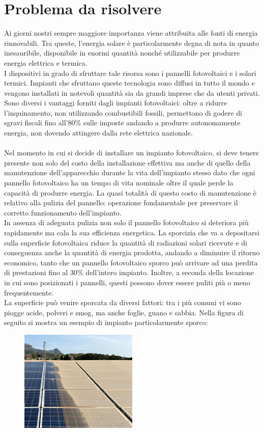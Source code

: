 \documentclass[a4paper, 12pt]{article}
\begin{document}
	\section{Problema da risolvere}
	Ai giorni nostri sempre maggiore importanza viene attribuita alle fonti di energia rinnovabili. Tra queste, l'energia solare è particolarmente degna di nota in quanto inesauribile, disponibile in enormi quantità nonché utilizzabile per produrre energia elettrica e termica.\\
	I dispositivi in grado di sfruttare tale risorsa sono i pannelli fotovoltaici e i solari termici. Impianti che sfruttano queste tecnologia sono diffusi in tutto il mondo e vengono installati in notevoli quantità sia da grandi imprese che da utenti privati. Sono diversi i vantaggi forniti dagli impianti fotovoltaici: oltre a ridurre l'inquinamento, non utilizzando combustibili fossili, permettono di godere di sgravi fiscali fino all'80\% sulle imposte andando a produrre autonomamente energia, non dovendo attingere dalla rete elettrica nazionale.\\\\
	Nel momento in cui si decide di installare un impianto fotovoltaico, si deve tenere presente non solo del costo della installazione effettiva ma anche di quello della manutenzione dell'apparecchio durante la vita dell'impianto stesso dato che ogni pannello fotovoltaico ha un tempo di vita nominale oltre il quale perde la capacità di produrre energia. La quasi totalità di questo costo di manutenzione è relativo alla pulizia del pannello: operazione fondamentale per preservare il corretto funzionamento dell'impianto.\\
	In assenza di adeguata pulizia non solo il pannello fotovoltaico si deteriora più rapidamente ma cala la sua efficienza energetica. La sporcizia che va a depositarsi sulla superficie fotovoltaica riduce la quantità di radiazioni solari ricevute e di conseguenza anche la quantità di energia prodotta, andando a diminuire il ritorno economico, tanto che un pannello fotovoltaico sporco può arrivare ad una perdita di prestazioni fino al 30\% dell'intero impianto. Inoltre, a seconda della locazione in cui sono posizionati i pannelli, questi possono dover essere puliti più o meno frequentemente.\\
	La superficie può venire sporcata da diversi fattori: tra i più comuni vi sono piogge acide, polveri e smog, ma anche foglie, guano e sabbia. Nella figura di seguito si mostra un esempio di impianto particolarmente sporco:
	\begin{figure}[h]
		\centering\includegraphics[width=0.5\textwidth]{Images/pannelli_sporchi2.jpg}
	\end{figure}\\
\end{document}
